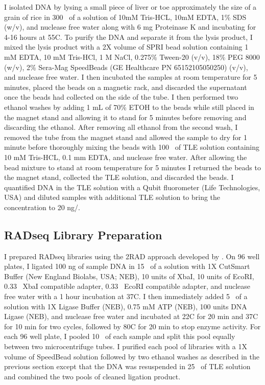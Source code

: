 I isolated DNA by lysing a small piece of liver or toe approximately 
the size of a grain of rice in 300 \uL\ of a solution of 10mM Tris-HCL, 10mM EDTA, 
1\% SDS (w/v), and nuclease free water along with 6 mg Proteinase K and 
incubating for 4-16 hours at 55\degree C.  
To purify the DNA and separate it from the lysis product, I mixed the lysis 
product with a 2X volume of SPRI bead solution containing 1 mM EDTA,  
10 mM Tris-HCl, 1 M NaCl, 0.275\% Tween-20 (v/v), 18\% PEG 8000 (w/v), 
2\% Sera-Mag SpeedBeads (GE Healthcare PN 65152105050250) (v/v), and nuclease free water.
I then incubated the samples at room temperature for 5 minutes, placed the 
beads on a magnetic rack, and discarded the supernatant once the beads had collected
on the side of the tube.  
I then performed two ethanol washes by adding 1 mL of 70\% ETOH to the beads
while still placed in the magnet stand and allowing it to stand for 5 minutes
before removing and discarding the ethanol. 
After removing all ethanol from the second wash, I removed the tube from the magnet 
stand and allowed the sample to dry for 1 minute before thoroughly mixing the beads with 100 \uL\ of 
TLE solution containing 10 mM Tris-HCL, 0.1 mm EDTA, and nuclease free water.
After allowing the bead mixture to stand at room temperature for 5 minutes I returned
the beads to the magnet stand, collected the TLE solution, and discarded the beads. 
I quantified DNA in the TLE solution with a Qubit
fluorometer (Life Technologies, USA) and diluted samples with additional TLE solution to 
bring the concentration to 20 ng/\uL.

\subsection{RADseq Library Preparation}
I prepared RADseq libraries using the 2RAD approach developed by \cite{bayona-vasquez2019}. 
On 96 well plates, I ligated 100 ng of sample DNA in 15 \uL\ of a solution with 
1X CutSmart Buffer (New England Biolabs, USA; NEB), 10 units of XbaI,
10 units of EcoRI, 0.33 \uM\ XbaI compatible adapter, 0.33 \uM\ EcoRI compatible adapter,
and nuclease free water with a 1 hour incubation at 37\degree C. 
I then immediately added 5 \uL\ of a solution with 1X Ligase Buffer (NEB),
0.75 mM ATP (NEB), 100 units DNA Ligase (NEB), and nuclease free water 
and incubated at 22\degree C for 20 min and 37\degree C for 10 min for two cycles, 
followed by 80\degree C for 20 min to stop enzyme activity.
For each 96 well plate, I pooled 10 \uL\ of each sample and split this pool 
equally between two microcentrifuge tubes.
I purified each pool of libraries with a 1X volume of SpeedBead solution followed 
by two ethanol washes as described in the previous section except that the DNA 
was resuspended in 25 \uL\ of TLE solution and combined the two pools of cleaned 
ligation product. 

